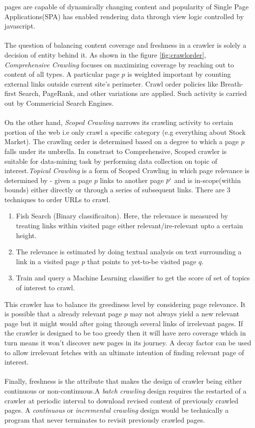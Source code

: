 pages are capable of dynamically changing content and popularity of Single Page Applications(SPA) has
enabled rendering data through view logic controlled by javascript.
\\
\\
The question of balancing content coverage and freshness in a crawler is solely a decision of entity behind
it. As shown in the figure \ref{fig:crawlorder}, \textit{Comprehensive Crawling} focuses on maximizing coverage by reaching out to content of all types.
A particular page $p$ is weighted important by counting external links outside current site's perimeter. Crawl order policies like Breath-first Search, PageRank, and other variations are applied. Such activity
is carried out by Commericial Search Engines.
\\
\\
On the other hand, \textit{Scoped Crawling} narrows its
crawling activity to certain portion of the web i.e only crawl a specific category (e.g everything about Stock Market). The crawling order is determined based on a degree to which a page $p$ falls under its umbrella.
In constrast to Comprehensive, Scoped crawler is suitable for data-mining task by performing
data collection on topic of interest.\textit{Topical Crawling} is a form of Scoped Crawling in which page relevance is determined by - given a  page $p$ links to another page $p`$ and is in-scope(within bounds) either directly or through a series of subsequent links. There are 3 techniques to order URLs to crawl.

\begin{enumerate}
\item Fish Search (Binary classificaiton). Here, the relevance is measured by treating links within visited
  page either relevant/ire-relevant upto a certain height.
\item The relevance is estimated by doing textual analysis on text surrounding a link in a visited page $p$
  that points to yet-to-be visited page $q$.
\item Train and query a Machine Learning classifier to get the score of set of topics of interest to crawl.
\end{enumerate}

This crawler has to balance its greediness level by considering page relevance. It is possible that a
already relevant page $p$ may not always yield a new relevant page but it might would after going through
several links of irrelevant pages. If the crawler is designed to be too greedy then it will have zero
coverage which in turn means it won't discover new pages in its journey. A decay factor can be used to
allow irrelevant fetches with an ultimate intention of finding relevant page of interest.
\\
\\
Finally, freshness is the attribute that makes the design of crawler being either continuous or non-continuous.A \textit{batch crawling} design requires the restarted of a crawler at periodic interval to download
revised content of previously crawled pages. A \textit{continuous} or \textit{incremental crawling} design
would be technically a program that never terminates to revisit previously crawled pages.


